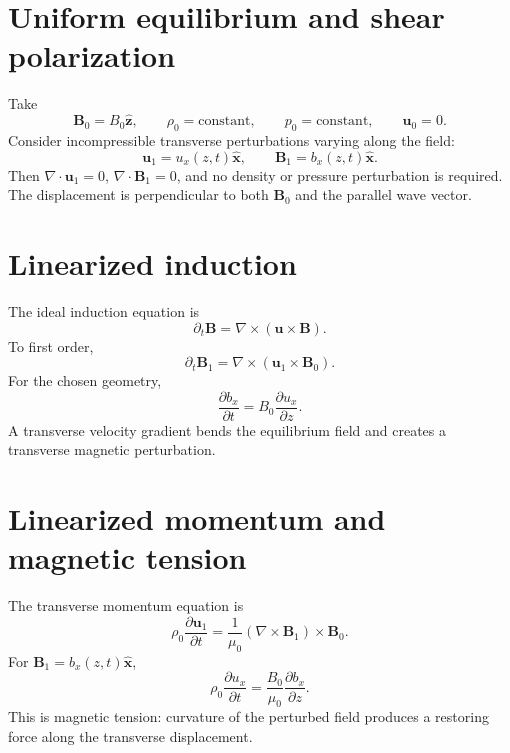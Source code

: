 \documentclass[11pt]{article}
\begin{document}
\section{Uniform equilibrium and shear polarization}

Take
\begin{equation}
\mathbf B_0=B_0\hat{\mathbf z},\qquad
\rho_0=\text{constant},\qquad
p_0=\text{constant},\qquad
\mathbf u_0=0.
\end{equation}
Consider incompressible transverse perturbations varying along the field:
\begin{equation}
\mathbf u_1=u_x(z,t)\hat{\mathbf x},\qquad
\mathbf B_1=b_x(z,t)\hat{\mathbf x}.
\end{equation}
Then $\nabla\cdot\mathbf u_1=0$, $\nabla\cdot\mathbf B_1=0$, and no density or pressure perturbation is required. The displacement is perpendicular to both $\mathbf B_0$ and the parallel wave vector.


\section{Linearized induction}

The ideal induction equation is
\begin{equation}
\partial_t\mathbf B=\nabla\times(\mathbf u\times\mathbf B).
\end{equation}
To first order,
\begin{equation}
\partial_t\mathbf B_1=\nabla\times(\mathbf u_1\times\mathbf B_0).
\end{equation}
For the chosen geometry,
\begin{equation}
\boxed{\frac{\partial b_x}{\partial t}
=B_0\frac{\partial u_x}{\partial z}}.
\end{equation}
A transverse velocity gradient bends the equilibrium field and creates a transverse magnetic perturbation.


\section{Linearized momentum and magnetic tension}

The transverse momentum equation is
\begin{equation}
\rho_0\frac{\partial\mathbf u_1}{\partial t}
=\frac{1}{\mu_0}(\nabla\times\mathbf B_1)\times\mathbf B_0.
\end{equation}
For $\mathbf B_1=b_x(z,t)\hat{\mathbf x}$,
\begin{equation}
\boxed{\rho_0\frac{\partial u_x}{\partial t}
=\frac{B_0}{\mu_0}\frac{\partial b_x}{\partial z}}.
\end{equation}
This is magnetic tension: curvature of the perturbed field produces a restoring force along the transverse displacement.
\end{document}
